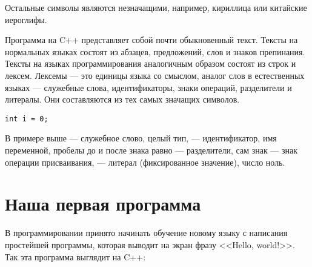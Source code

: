 \documentclass{article}
\begin{document}

Остальные символы являются незначащими, например, кириллица или китайские иероглифы.

Программа на C++ представляет собой почти обыкновенный текст. Тексты на нормальных языках состоят из абзацев, предложений, слов и знаков препинания. Тексты на языках программирования аналогичным образом состоят из строк и лексем. Лексемы --- это единицы языка со смыслом, аналог слов в естественных языках --- служебные слова, идентификаторы, знаки операций, разделители и литералы. Они составляются из тех самых значащих символов.

\begin{lstlisting}[caption={Пример лексем}, captionpos=b, style=cpp]
int i = 0;
\end{lstlisting}

В примере выше  --- служебное слово, целый тип,  --- идентификатор, имя переменной, пробелы до и после знака равно --- разделители, сам знак \cppword{=} --- знак операции присваивания,  --- литерал (фиксированное значение), число ноль.


\section*{Наша первая программа}

В программировании принято начинать обучение новому языку с написания простейшей программы, которая выводит на экран фразу <<Hello, world!>>. Так эта программа выглядит на C++:
\end{document}
